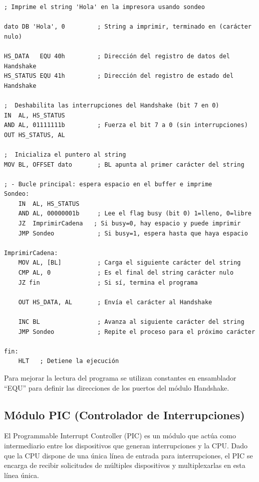 \documentclass[12pt,oneside]{templates/unerthesis}
\begin{document}
\begin{lstlisting}
; Imprime el string 'Hola' en la impresora usando sondeo

dato DB 'Hola', 0         ; String a imprimir, terminado en (carácter nulo)

HS_DATA   EQU 40h         ; Dirección del registro de datos del Handshake
HS_STATUS EQU 41h         ; Dirección del registro de estado del Handshake

;  Deshabilita las interrupciones del Handshake (bit 7 en 0) 
IN  AL, HS_STATUS
AND AL, 01111111b         ; Fuerza el bit 7 a 0 (sin interrupciones)
OUT HS_STATUS, AL

;  Inicializa el puntero al string 
MOV BL, OFFSET dato       ; BL apunta al primer carácter del string

; - Bucle principal: espera espacio en el buffer e imprime 
Sondeo:
    IN  AL, HS_STATUS
    AND AL, 00000001b     ; Lee el flag busy (bit 0) 1=lleno, 0=libre
    JZ  ImprimirCadena   ; Si busy=0, hay espacio y puede imprimir
    JMP Sondeo            ; Si busy=1, espera hasta que haya espacio

ImprimirCadena:
    MOV AL, [BL]          ; Carga el siguiente carácter del string
    CMP AL, 0             ; Es el final del string carácter nulo
    JZ fin                ; Si sí, termina el programa

    OUT HS_DATA, AL       ; Envía el carácter al Handshake

    INC BL                ; Avanza al siguiente carácter del string
    JMP Sondeo            ; Repite el proceso para el próximo carácter

fin:
    HLT   ; Detiene la ejecución\end{lstlisting}

Para mejorar la lectura del programa se utilizan constantes en ensamblador ``EQU'' para definir las direcciones de los puertos del módulo Handshake.

\hypertarget{muxf3dulo-pic-controlador-de-interrupciones}{%
\subsection{Módulo PIC (Controlador de Interrupciones)}\label{muxf3dulo-pic-controlador-de-interrupciones}}

El Programmable Interrupt Controller (PIC) es un módulo que actúa como intermediario entre los dispositivos que generan interrupciones y la CPU. Dado que la CPU dispone de una única línea de entrada para interrupciones, el PIC se encarga de recibir solicitudes de múltiples dispositivos y multiplexarlas en esta línea única.
\end{document}
